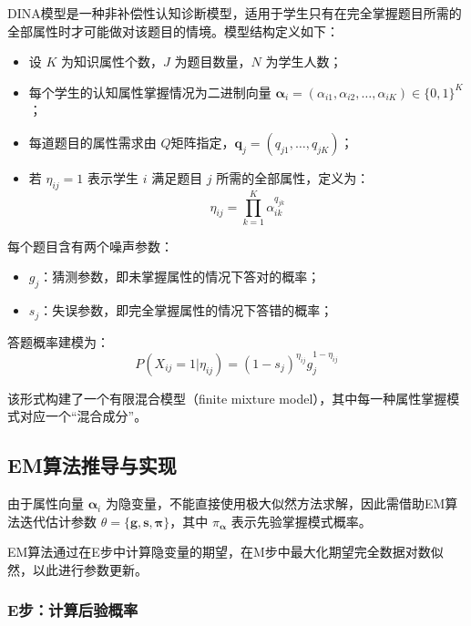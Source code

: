 \documentclass[a4paper,12pt]{ctexart} %
\begin{document}
DINA模型是一种非补偿性认知诊断模型，适用于学生只有在完全掌握题目所需的全部属性时才可能做对该题目的情境。模型结构定义如下：

\begin{itemize}
  \item 设 $K$ 为知识属性个数，$J$ 为题目数量，$N$ 为学生人数；
  \item 每个学生的认知属性掌握情况为二进制向量 $\boldsymbol{\alpha}_i = (\alpha_{i1}, \alpha_{i2}, \ldots, \alpha_{iK}) \in \{0,1\}^K$；
  \item 每道题目的属性需求由 $Q$矩阵指定，$\boldsymbol{q}_j = (q_{j1}, \ldots, q_{jK})$；
  \item 若 $\eta_{ij} = 1$ 表示学生 $i$ 满足题目 $j$ 所需的全部属性，定义为：
  \begin{equation}
    \eta_{ij} = \prod_{k=1}^{K} \alpha_{ik}^{q_{jk}}
  \end{equation}
\end{itemize}

每个题目含有两个噪声参数：

\begin{itemize}
  \item $g_j$：猜测参数，即未掌握属性的情况下答对的概率；
  \item $s_j$：失误参数，即完全掌握属性的情况下答错的概率；
\end{itemize}

答题概率建模为：
\begin{equation}
    P(X_{ij} = 1 | \eta_{ij}) = (1 - s_j)^{\eta_{ij}} g_j^{1 - \eta_{ij}}
\end{equation}

该形式构建了一个有限混合模型（finite mixture model），其中每一种属性掌握模式对应一个“混合成分”。

\subsection{EM算法推导与实现}

由于属性向量 $\boldsymbol{\alpha}_i$ 为隐变量，不能直接使用极大似然方法求解，因此需借助EM算法迭代估计参数 $\theta = \{\boldsymbol{g}, \boldsymbol{s}, \boldsymbol{\pi}\}$，其中 $\pi_{\boldsymbol{\alpha}}$ 表示先验掌握模式概率。

EM算法通过在E步中计算隐变量的期望，在M步中最大化期望完全数据对数似然，以此进行参数更新。

\subsubsection{E步：计算后验概率}
\end{document}
